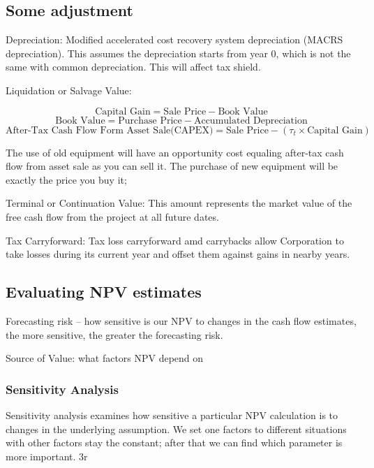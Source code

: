 \documentclass[10pt, a4paper]{article}
\begin{document}

    \subsection{Some adjustment}

    Depreciation: Modified accelerated cost recovery system depreciation (MACRS depreciation). This assumes the depreciation starts from year 0, which is not the same with common depreciation. This will affect tax shield.
    \medskip
    
    Liquidation or Salvage Value:

    $$\text{Capital Gain} = \text{Sale Price} - \text{Book Value}$$
    $$\text{Book Value} = \text{Purchase Price} - \text{Accumulated Depreciation}$$
    $$\text{After-Tax Cash Flow Form Asset Sale(CAPEX)} = \text{Sale Price} - (\tau_t \times \text{Capital Gain})$$

    The use of old equipment will have an opportunity cost equaling after-tax cash flow from asset sale as you can sell it. The purchase of new equipment will be exactly the price you buy it; 

    \medskip

    Terminal or Continuation Value: This amount represents the market value of the free cash flow from the project at all future dates. 


    Tax Carryforward: Tax loss carryforward  amd carrybacks allow Corporation to take losses during its current year and offset them against gains in nearby years. 

    \subsection{Evaluating NPV estimates} 
        Forecasting risk -- how sensitive is our NPV to changes in the cash flow estimates, the more sensitive, the greater the forecasting risk. 

        Source of Value: what factors NPV depend on

        \subsubsection{Sensitivity Analysis} 
            Sensitivity analysis examines how sensitive a particular NPV calculation is to changes in the underlying assumption. We set one factors to different situations with other factors stay the constant; after that we can find which parameter is more important. 3r
\end{document}
